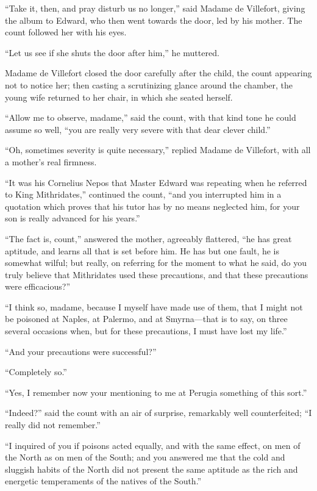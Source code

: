 “Take it, then, and pray disturb us no longer,” said Madame de
Villefort, giving the album to Edward, who then went towards the door,
led by his mother. The count followed her with his eyes.

“Let us see if she shuts the door after him,” he muttered.

Madame de Villefort closed the door carefully after the child, the
count appearing not to notice her; then casting a scrutinizing glance
around the chamber, the young wife returned to her chair, in which she
seated herself.

“Allow me to observe, madame,” said the count, with that kind tone he
could assume so well, “you are really very severe with that dear clever
child.”

“Oh, sometimes severity is quite necessary,” replied Madame de
Villefort, with all a mother’s real firmness.

“It was his Cornelius Nepos that Master Edward was repeating when he
referred to King Mithridates,” continued the count, “and you
interrupted him in a quotation which proves that his tutor has by no
means neglected him, for your son is really advanced for his years.”

“The fact is, count,” answered the mother, agreeably flattered, “he has
great aptitude, and learns all that is set before him. He has but one
fault, he is somewhat wilful; but really, on referring for the moment
to what he said, do you truly believe that Mithridates used these
precautions, and that these precautions were efficacious?”

“I think so, madame, because I myself have made use of them, that I
might not be poisoned at Naples, at Palermo, and at Smyrna—that is to
say, on three several occasions when, but for these precautions, I must
have lost my life.”

“And your precautions were successful?”

“Completely so.”

“Yes, I remember now your mentioning to me at Perugia something of this
sort.”

“Indeed?” said the count with an air of surprise, remarkably well
counterfeited; “I really did not remember.”

“I inquired of you if poisons acted equally, and with the same effect,
on men of the North as on men of the South; and you answered me that
the cold and sluggish habits of the North did not present the same
aptitude as the rich and energetic temperaments of the natives of the
South.”

